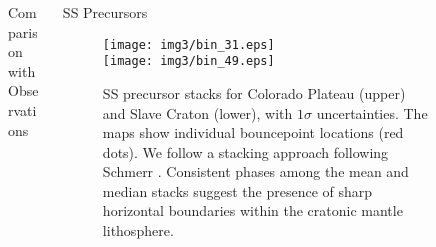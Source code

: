 \documentclass[final]{beamer}
\newlength{\sepwid}
\newlength{\onecolwid}
\newlength{\twocolwid}
\begin{document}
\begin{frame}[t]
\begin{columns}[t]
\begin{column}{\twocolwid}
\begin{columns}[t,totalwidth=\twocolwid]
\begin{column}{\onecolwid}
\begin{alertblock}{Comparison with Observations}
\begin{itemize}
\begin{itemize}
\end{itemize}


\end{itemize}

\end{alertblock}


\end{column} %

\begin{column}{\onecolwid} %


\begin{block}{SS Precursors}

\begin{figure}
\texttt{[image: img3/bin\_31.eps]} \\
\texttt{[image: img3/bin\_49.eps]}
\caption{SS precursor stacks for Colorado Plateau (upper) and Slave Craton (lower), with $1\sigma$ uncertainties.  The maps show individual bouncepoint locations (red dots).  We follow a stacking approach following Schmerr \cite{Schmerr2012}.
Consistent phases among the mean and median stacks suggest the presence of sharp horizontal boundaries within the cratonic mantle lithosphere.
}
\end{figure}

\end{block}


\end{column} %

\end{columns} %

\end{column} %

\begin{column}{\sepwid}\end{column} %

\begin{column}{\onecolwid} %


\end{column}
\end{columns}
\end{frame}
\end{document}
